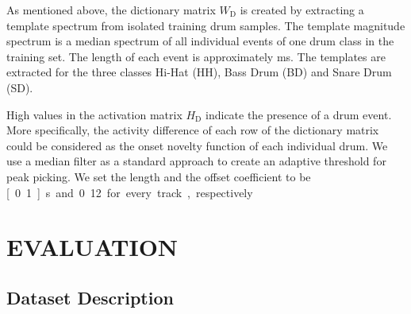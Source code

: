 \documentclass{article}
\begin{document}
As mentioned above, the dictionary matrix $W_\mathrm{D}$ is created by extracting a template spectrum from isolated training drum samples. The template magnitude spectrum is a median spectrum of all individual events of one drum class in the training set. The length of each event  is approximately \unit[80]{ms}. The templates are extracted for the three classes Hi-Hat (HH), Bass Drum (BD) and Snare Drum (SD).   

High values in the activation matrix $H_\mathrm{D}$ indicate the presence of a drum event. More specifically, the activity difference of each row of the dictionary matrix could be considered as the onset novelty function of each individual drum. We use a median filter as a standard approach to create an adaptive threshold for peak picking. We set the length and the offset coefficient to be \unit[0.1]{s} and 0.12 for every track, respectively. 
\vspace{-2mm}
\section{EVALUATION}\label{sec:Evaluation}
\subsection{Dataset Description}\label{subsec:data set description}
\end{document}
